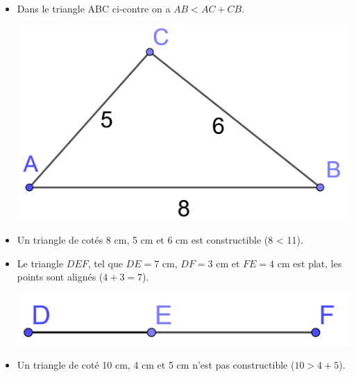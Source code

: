 \documentclass[xcolor={dvipsnames}]{beamer}
\begin{document}
\begin{frame}
	\begin{myexs}
		
		\begin{itemize}
			\item Dans le triangle ABC ci-contre on a $AB < AC + CB.$
				\begin{center}
					\includegraphics[scale=0.25]{triangle1}\pause
					
				\end{center}
			
			\item 	Un triangle de cotés 8 cm, 5 cm et 6 cm est constructible (8 < 11).
		\end{itemize}
		
		
		
	\end{myexs}
\end{frame}

\begin{frame}
	\begin{myexs}
		
		\begin{itemize}
			\item Le triangle $DEF$, tel que $DE = 7$ cm, $DF = 3$ cm et $FE = 4$ cm est plat, les points sont alignés ($4 + 3 = 7$).
			\begin{center}
				
				\includegraphics[scale=0.2]{triangle2}\pause
			\end{center}
			
			\item 	Un triangle de coté 10 cm, 4 cm et 5 cm n'est pas constructible ($10 > 4 + 5$).
		\end{itemize}
		
		
		
	\end{myexs}
\end{frame}
\end{document}
